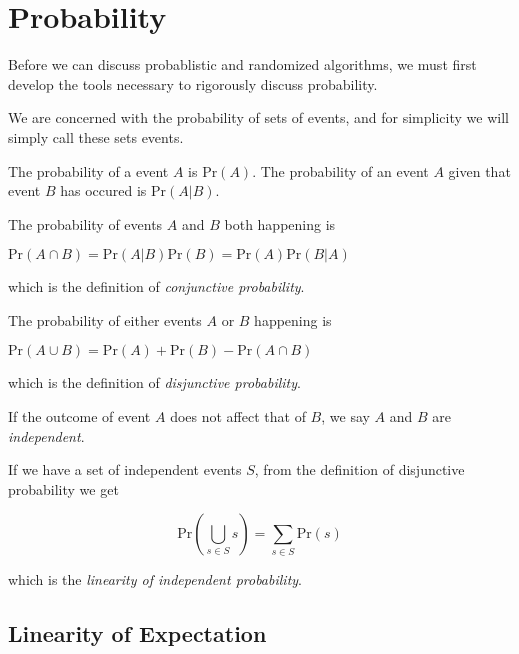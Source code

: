 \renewcommand{\Pr}{\text{Pr}}
\newcommand{\Var}{\text{Var}}

\chapter{Probability}

Before we can discuss probablistic and randomized algorithms, we must
first develop the tools necessary to rigorously discuss probability.

We are concerned with the probability of sets of events, and for
simplicity we will simply call these sets events.

The probability of a event $A$ is $\Pr(A)$.  The probability of an
event $A$ given that event $B$ has occured is $\Pr(A | B)$.

The probability of events $A$ and $B$ both happening is

\begin{center}
\begin{math}
\Pr(A \cap B)
= \Pr(A|B)\Pr(B) = \Pr(A)\Pr(B|A)
\end{math}
\end{center}

which is the definition of \emph{conjunctive probability}.

The probability of either events $A$ or $B$ happening is

\begin{center}
\begin{math}
  \Pr(A \cup B)
  = \Pr(A) + \Pr(B) - \Pr(A \cap B)
\end{math}
\end{center}

which is the definition of \emph{disjunctive probability}.

If the outcome of event $A$ does not affect that of $B$, we say $A$
and $B$ are \emph{independent}.

If we have a set of independent events $S$, from the definition of
disjunctive probability we get

\begin{displaymath}
  \Pr \left( \bigcup_{s \in S} s \right) = \sum_{s \in S} \Pr(s)
\end{displaymath}

which is the \emph{linearity of independent probability}.

\section{Linearity of Expectation}

